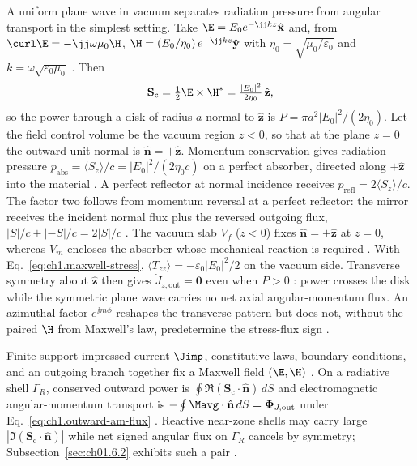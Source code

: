 A uniform plane wave in vacuum separates radiation pressure from angular transport in the simplest setting. Take
$\E=E_0 e^{-\jj k z}\hat{\mathbf{x}}$ and, from $\curl\E=-\jj\omega\mu_0\H$,
$\H=(E_0/\eta_0)\,e^{-\jj k z}\hat{\mathbf{y}}$ with
$\eta_0=\sqrt{\mu_0/\varepsilon_0}$ and $k=\omega\sqrt{\varepsilon_0\mu_0}$
\cite{stratton1941}. Then
\begin{equation}
\label{eq:ch1.intro-plane-wave-preview}
\mathbf{S}_\mathrm{c}=\tfrac12\E\times\H^*=\tfrac{|E_0|^2}{2\eta_0}\,\hat{\mathbf{z}},
\end{equation}
so the power through a disk of radius $a$ normal to $\hat{\mathbf{z}}$ is
$P=\pi a^2 |E_0|^2/(2\eta_0)$. Let the field control volume be the vacuum region
$z<0$, so that at the plane $z=0$ the outward unit normal is $\hat{\mathbf{n}}=+\hat{\mathbf{z}}$.
Momentum conservation gives radiation pressure $p_{\mathrm{abs}}=\langle S_z\rangle/c=
|E_0|^2/(2\eta_0 c)$ on a perfect absorber, directed along $+\hat{\mathbf{z}}$ into the
material \cite{stratton1941}. A perfect reflector at normal incidence receives
$p_{\mathrm{refl}}=2\langle S_z\rangle/c$. The factor two follows from momentum reversal at a perfect reflector: the mirror receives the incident normal flux plus the reversed outgoing flux, $|S|/c+|{-S}|/c=2|S|/c$ \cite{maxwell1873,stratton1941}. The vacuum slab $V_f$ ($z<0$) fixes $\hat{\mathbf{n}}=+\hat{\mathbf{z}}$ at $z=0$, whereas $V_m$ encloses the absorber whose mechanical reaction is required \cite{maxwell1873,stratton1941}. With Eq.~\eqref{eq:ch1.maxwell-stress}, $\langle T_{zz}\rangle=-\varepsilon_0|E_0|^2/2$ on the vacuum side. Transverse symmetry about $\hat{\mathbf{z}}$ then gives $\dot J_{z,\mathrm{out}}=\mathbf{0}$ even when $P>0$ \cite{beth1936}: power crosses the disk while the symmetric plane wave carries no net axial angular-momentum flux. An azimuthal factor $e^{\jj m\phi}$ reshapes the transverse pattern but does not, without the paired $\H$ from Maxwell's law, predetermine the stress-flux sign \cite{allen1992,stratton1941}.

Finite-support impressed current $\Jimp$, constitutive laws, boundary conditions, and an
outgoing branch together fix a Maxwell field $(\E,\H)$ \cite{maxwell1873,stratton1941}.
On a radiative shell $\Gamma_R$, conserved outward power is
$\oint \Re(\mathbf{S}_\mathrm{c}\cdot\hat{\mathbf{n}})\,dS$ and electromagnetic
angular-momentum transport is $-\oint \Mavg\cdot\hat{\mathbf{n}}\,dS=\boldsymbol{\Phi}_{J,\mathrm{out}}$
under Eq.~\eqref{eq:ch1.outward-am-flux} \cite{beth1936}. Reactive near-zone shells may
carry large $|\Im(\mathbf{S}_\mathrm{c}\cdot\hat{\mathbf{n}})|$ while net signed angular
flux on $\Gamma_R$ cancels by symmetry; Subsection~\ref{sec:ch01.6.2} exhibits such a pair
\cite{allen1992,chu1948}.

